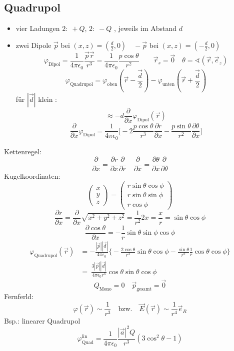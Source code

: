 \documentclass[titlepage,12pt,a4paper,ngerman]{report}
\newcommand{\tx}[1]{\textrm{#1}}
\begin{document}
\subsection{Quadrupol}
\begin{itemize}
\item vier Ladungen $ 2: \; +Q$, $ 2: \; -Q$ , jeweils im Abstand $d$
\item zwei Dipole $\vec{p}$ bei $(x,z) = (\frac{d}{2}, 0) \quad -\vec{p}$ bei $(x,z) = (-\frac{d}{2}, 0)$
$$ \varphi_{\tx{Dipol}} = \frac{1}{4\pi\epsilon_0} \frac{\vec{p}\vec{r}}{r^3} = \frac{1}{4\pi\epsilon_0} \frac{p \cos \theta}{r^2} \qquad \vec{r}_s = \vec{0} \quad \theta = \sphericalangle (\vec{r}, \vec{e}_z)$$
$$\varphi _{\tx{Quadrupol}} = \varphi_{\tx{oben}}(\vec{r}- \frac{\vec{d}}{2}) - \varphi_{\tx{unten}}(\vec{r}+ \frac{\vec{d}}{2})$$
für $|\vec{d}|$ klein : $$\approx -d \frac{\partial}{\partial x } \varphi_{\tx{Dipol}} (\vec{r})$$
$$\frac{\partial }{\partial x} \varphi_{\tx{Dipol}} = \frac{1}{4\pi\epsilon_0} \bigg[ -2 \frac{p \cos \theta}{r^3} \frac{\partial r }{\partial x} - \frac{p \sin \theta }{r^2} \frac{\partial \theta}{\partial x} \bigg]$$
\end{itemize}
Kettenregel: 
$$ \frac{\partial}{\partial x} = \frac{\partial r}{\partial x} \frac{\partial}{\partial r} \quad \frac{\partial}{\partial x} = \frac{\partial \theta}{\partial x} \frac{\partial}{\partial \theta}$$
Kugelkoordinaten: $$ \begin{pmatrix}
x\\
y\\
z
\end{pmatrix} = \begin{pmatrix}
r \sin \theta \cos \phi \\
r \sin \theta \sin \phi \\
r \cos \phi
\end{pmatrix}$$
$$ \frac{\partial r}{\partial x} = \frac{\partial}{\partial x} \sqrt{x^2+y^2+z^2} = \frac{1}{r^2} 2x = \frac{x}{r} = \sin \theta \cos \phi $$
$$\frac{\partial \cos \theta}{\partial x} = -\frac{1}{r} \sin \theta \sin \phi \cos \phi$$
\begin{align*}
\varphi_{\tx{Quadrupol}}(\vec{r}) &= -\frac{|\vec{p}||\vec{d}|}{4\pi\epsilon_0} \bigg\{ - \frac{2 \cos \theta }{r^3} \sin \theta \cos \phi - \frac{\sin \theta}{r^2} \frac{1}{r} \cos \theta \cos \phi \bigg\} \\
& = \  \frac{3|\vec{p}||\vec{d}|}{4\pi\epsilon_0 r^3} \cos \theta \sin \theta \cos \phi
\end{align*}
$$Q_{\tx{Mono}} = 0  \quad \vec{p}_{\tx{gesamt}} = \vec{0}$$
Fernferld: $$ \varphi(\vec{r}) \sim \frac{1}{r^3} \quad \textrm{bzw.} \quad \vec{E} (\vec{r}) \sim \frac{1}{r^4} \vec{e}_R$$
Bsp.: linearer Quadrupol
$$\varphi^{\tx{lin}}_{\tx{Quad}} = \frac{1}{4\pi\epsilon_0} \frac{|\vec{a}|^2Q}{r^3} (3 \cos^2\theta -1)$$
\end{document}
